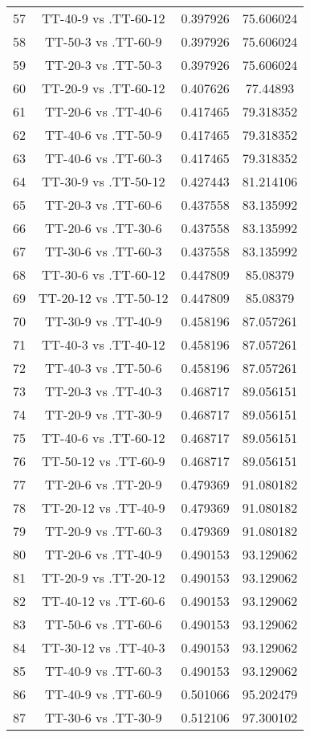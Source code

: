 \documentclass[a4paper,10pt]{article}
\begin{document}
\begin{landscape}
\begin{table}[!htp]
\begin{tabular}{cccc}
57&TT-40-9 vs .TT-60-12&0.397926&75.606024\\
58&TT-50-3 vs .TT-60-9&0.397926&75.606024\\
59&TT-20-3 vs .TT-50-3&0.397926&75.606024\\
60&TT-20-9 vs .TT-60-12&0.407626&77.44893\\
61&TT-20-6 vs .TT-40-6&0.417465&79.318352\\
62&TT-40-6 vs .TT-50-9&0.417465&79.318352\\
63&TT-40-6 vs .TT-60-3&0.417465&79.318352\\
64&TT-30-9 vs .TT-50-12&0.427443&81.214106\\
65&TT-20-3 vs .TT-60-6&0.437558&83.135992\\
66&TT-20-6 vs .TT-30-6&0.437558&83.135992\\
67&TT-30-6 vs .TT-60-3&0.437558&83.135992\\
68&TT-30-6 vs .TT-60-12&0.447809&85.08379\\
69&TT-20-12 vs .TT-50-12&0.447809&85.08379\\
70&TT-30-9 vs .TT-40-9&0.458196&87.057261\\
71&TT-40-3 vs .TT-40-12&0.458196&87.057261\\
72&TT-40-3 vs .TT-50-6&0.458196&87.057261\\
73&TT-20-3 vs .TT-40-3&0.468717&89.056151\\
74&TT-20-9 vs .TT-30-9&0.468717&89.056151\\
75&TT-40-6 vs .TT-60-12&0.468717&89.056151\\
76&TT-50-12 vs .TT-60-9&0.468717&89.056151\\
77&TT-20-6 vs .TT-20-9&0.479369&91.080182\\
78&TT-20-12 vs .TT-40-9&0.479369&91.080182\\
79&TT-20-9 vs .TT-60-3&0.479369&91.080182\\
80&TT-20-6 vs .TT-40-9&0.490153&93.129062\\
81&TT-20-9 vs .TT-20-12&0.490153&93.129062\\
82&TT-40-12 vs .TT-60-6&0.490153&93.129062\\
83&TT-50-6 vs .TT-60-6&0.490153&93.129062\\
84&TT-30-12 vs .TT-40-3&0.490153&93.129062\\
85&TT-40-9 vs .TT-60-3&0.490153&93.129062\\
86&TT-40-9 vs .TT-60-9&0.501066&95.202479\\
87&TT-30-6 vs .TT-30-9&0.512106&97.300102\\

\end{tabular}
\end{table}
\end{landscape}
\end{document}
